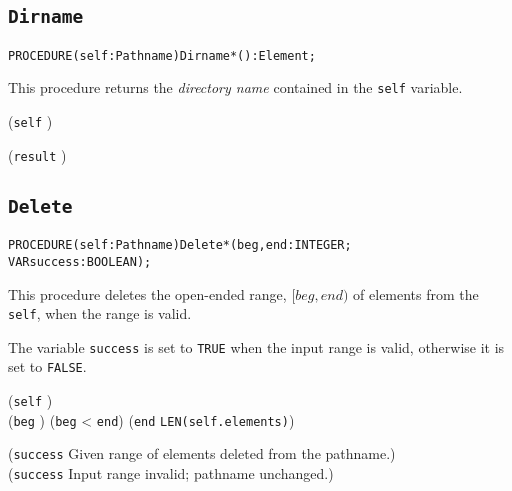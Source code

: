 \subsection{\texttt{Dirname}}\label{pathnames:dirname}
\begin{alltt}
  PROCEDURE (self : Pathname) Dirname*() : Element;
\end{alltt}

\begin{semantics}
  This procedure returns the \emph{directory name} contained in the
  \texttt{self} variable.
\end{semantics}

\begin{precondition}
(\texttt{self} \neq \nil) \logicaland {}
\end{precondition}

\begin{postcondition}
(\texttt{result} \neq \nil) \logicaland {}
\end{postcondition}


\subsection{\texttt{Delete}}\label{pathnames:delete}
\begin{alltt}
  PROCEDURE (self : Pathname) Delete*(beg, end : INTEGER;
                                      VAR success : BOOLEAN);
\end{alltt}

\begin{semantics}
  This procedure deletes the open-ended range, $[beg, end)$ of
    elements from the \texttt{self}, when the range is valid.

    The variable \texttt{success} is set to \texttt{TRUE} when the
    input range is valid, otherwise it is set to \texttt{FALSE}.
\end{semantics}

\begin{precondition}
  (\texttt{self} \neq \nil) \logicaland {}
  \logicaland \\
  (\texttt{beg} ) \logicaland (\texttt{beg} < \texttt{end})
  \logicaland (\texttt{end} \leq \texttt{LEN(self.elements\deref)})
\end{precondition}

\begin{postcondition}
  (\texttt{success} \implies \textrm{Given range of
    elements deleted from the pathname.}) \logicalor \\
  (\texttt{\logicalnot success} \implies \textrm{Input range invalid;
    pathname unchanged.})
\end{postcondition}

